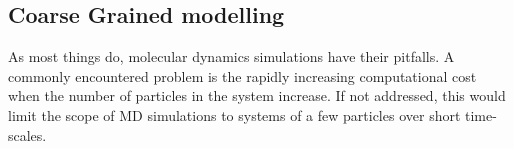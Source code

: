 %
%
%
%
%
%
%

\subsection{Coarse Grained modelling}
As most things do, molecular dynamics simulations have their pitfalls. A commonly
encountered problem is the rapidly increasing computational cost when the number of
particles in the system increase. If not addressed, this would limit the scope of MD
simulations to systems of a few particles over short time-scales.

